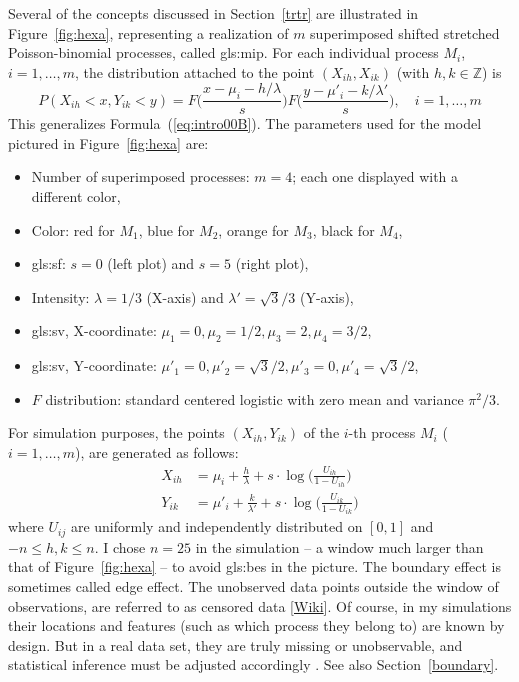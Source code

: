 \documentclass[10pt]{article}
\begin{document}
Several of the concepts discussed in Section~\ref{trtr} are illustrated in Figure~\ref{fig:hexa}, representing a realization of $m$ superimposed shifted stretched Poisson-binomial processes,
 called \gls{gls:mip}. For each individual process $M_i$, $i=1,\dots,m$, the distribution attached to the point $(X_{ih},X_{ik})$ (with $h,k\in \mathbb{Z}$) is
$$
P(X_{ih}<x, Y_{ik}<y) = F\Big(\frac{x-\mu_i -h/\lambda}{s}\Big)F\Big(\frac{y-\mu'_i - k/\lambda'}{s}\Big),  \quad i=1,\dots,m
$$
This generalizes Formula~(\ref{eq:intro00B}). The parameters used for the model pictured in Figure~\ref{fig:hexa} are:
\quad \\
\begin{itemize}
\item Number of superimposed processes: $m=4$; each one displayed with a different color, 
\item Color: red for $M_1$, blue for $M_2$, orange for $M_3$, black for $M_4$,
\item \gls{gls:sf}: $s=0$ (left plot) and $s=5$ (right plot),
\item Intensity: $\lambda=1/3$ (X-axis) and $\lambda'=\sqrt{3}/3$ (Y-axis),
\item \Gls{gls:sv}, X-coordinate: $\mu_1=0, \mu_2=1/2, \mu_3=2, \mu_4=3/2 $,
\item \Gls{gls:sv}, Y-coordinate: $\mu'_1=0, \mu'_2=\sqrt{3}/2, \mu'_3=0, \mu'_4=\sqrt{3}/2 $,
\item $F$ distribution: standard centered \textcolor{index}{logistic} with zero mean and variance $\pi^2/3$.
\end{itemize}
For simulation purposes, the points $(X_{ih},Y_{ik})$ of the $i$-th process $M_i$ ($i=1,\dots,m$), are generated as follows:  
\begin{align}
X_{ih} & =\mu_i + \frac{h}{\lambda} +s \cdot \log \Big(\frac{U_{ih}}{1-U_{ih}}\Big) \label{simm1}\\
Y_{ik} & =\mu'_i+ \frac{k}{\lambda'} +s \cdot \log\Big(\frac{U_{ik}}{1-U_{ik}}\Big) \label{simm2}
\end{align}
where $U_{ij}$ are uniformly and independently distributed on $[0,1]$ and $-n\leq h,k\leq n$. 
I chose $n=25$ in the simulation -- a window much larger than that of Figure~\ref{fig:hexa} -- to avoid
\glspl{gls:be} in the picture. The boundary effect is sometimes called 
\textcolor{index}{edge effect}. The unobserved data points outside the 
window of observations, are referred to as \textcolor{index}{censored data} [\href{https://en.wikipedia.org/wiki/Censoring_(statistics)}{Wiki}]. 
Of course, in my simulations their locations and features (such as which process they belong to) are known by design. But in a real data set, they are truly 
missing or unobservable, and statistical inference must be adjusted accordingly 
\cite{censored}. 
See also Section~\ref{boundary}.
\end{document}
